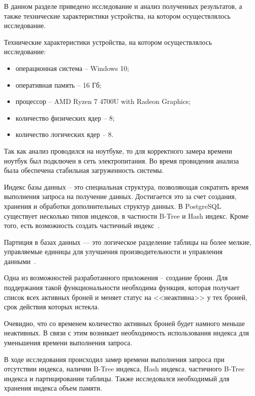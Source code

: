 \label{cha:R}
В данном разделе приведено исследование и анализ полученных результатов, а также технические характеристики устройства, на котором осуществлялось исследование.

Технические характеристики устройства, на котором осуществлялось исследование:
\begin{itemize}
	\item операционная система -- Windows 10;
	\item оперативная память -- 16 Гб;
	\item процессор -- AMD Ryzen 7 4700U with Radeon Graphics;
	\item количество физических ядер -- 8;
	\item количество логических ядер -- 8.
\end{itemize}

Так как анализ проводился на ноутбуке, то для корректного замера времени ноутбук был подключен в сеть электропитания. Во время провидения анализа была обеспечена стабильная загруженность системы.

Индекс базы данных -- это специальная структура, позволяющая сократить время выполнения запроса на получение данных. 
Достигается это за счет создания, хранения и обработки дополнительных структур данных.
В PostgreSQL существует несколько типов индексов, в частности B-Tree и Hash индекс. Кроме того, есть возможность создать частичный индекс~\cite{idx}.

Партиция в базах данных — это логическое разделение таблицы на более мелкие, управляемые единицы для улучшения производительности и управления данными~\cite{partition}.

Одна из возможностей разработанного приложения -- создание брони. Для поддержания такой функциональности необходима функция, которая получает список всех активных броней и меняет статус на <<неактивна>> у тех броней, срок действия которых истекла.

Очевидно, что со временем количество активных броней будет намного меньше неактивных. В связи с этим возникает необходимость использования индекса для уменьшения времени выполнения запроса.

В ходе исследования происходил замер времени выполнения запроса при отсутствии индекса, наличии B-Tree индекса, Hash индекса, частичного B-Tree индекса и партицировании таблицы.
Также исследовался необходимый для хранения индекса объем памяти.

